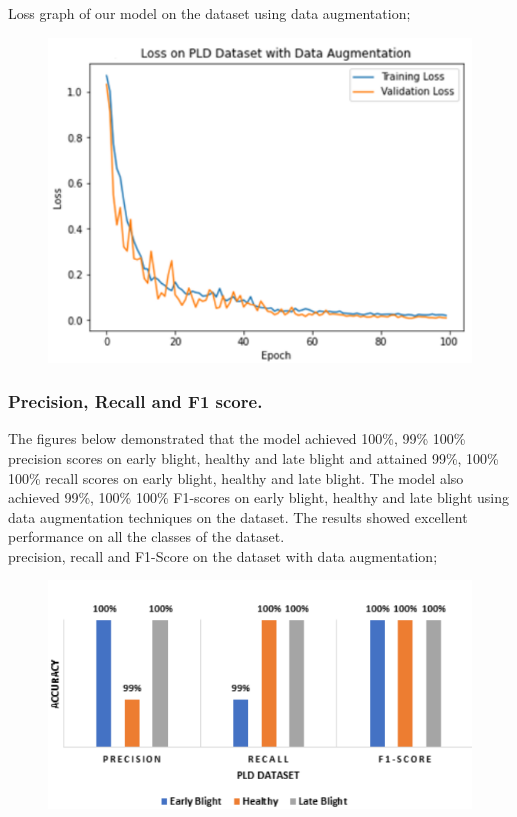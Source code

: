 \documentclass[11pt]{report}
\begin{document}
Loss graph of our model on the dataset using data augmentation;\\
\begin{figure}[h]
	\centerline{\small 
		\includegraphics[height=0.25\textheight]  {p4}}
\end{figure}

\newpage
\subsubsection*{Precision, Recall and F1 score.}
The figures below demonstrated that the model achieved 100\%, 99\% 100\% precision scores on early blight, healthy and
late blight and attained 99\%, 100\% 100\% recall scores on early blight, healthy and late
blight. The model also achieved 99\%, 100\% 100\% F1-scores on early
blight, healthy and late blight using data augmentation techniques on the dataset.
The results showed excellent performance on all the classes of the  dataset.\\


precision, recall and F1-Score on the dataset with data augmentation;\\
\begin{figure}[h]
	\centerline{\small 
		\includegraphics[height=0.25\textheight]  {p5}}
\end{figure}
\end{document}
